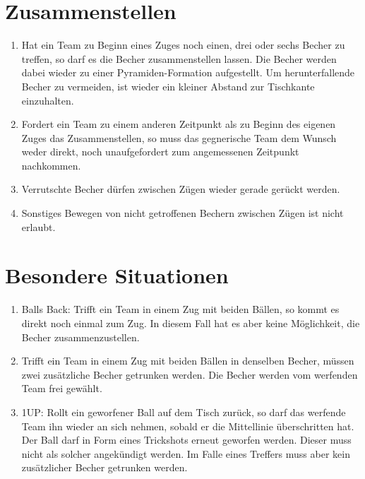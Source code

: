\section{Zusammenstellen}
\begin{enumerate}[label={(\arabic*)}]
    \item
    Hat ein Team zu Beginn eines Zuges noch einen, drei oder sechs Becher zu treffen, so darf es die Becher zusammenstellen lassen.
    Die Becher werden dabei wieder zu einer Pyramiden-Formation aufgestellt.
    Um herunterfallende Becher zu vermeiden, ist wieder ein kleiner Abstand zur Tischkante einzuhalten.

    \item
    Fordert ein Team zu einem anderen Zeitpunkt als zu Beginn des eigenen Zuges das Zusammenstellen, so muss das gegnerische Team dem Wunsch weder direkt, noch unaufgefordert zum angemessenen Zeitpunkt nachkommen.

    \item
    Verrutschte Becher dürfen zwischen Zügen wieder gerade gerückt werden.

    \item
    Sonstiges Bewegen von nicht getroffenen Bechern zwischen Zügen ist nicht erlaubt.
\end{enumerate}

\section{Besondere Situationen}
\begin{enumerate}[label={(\arabic*)}]
    \item
    \glqq{}Balls Back\grqq{}: Trifft ein Team in einem Zug mit beiden Bällen, so kommt es direkt noch einmal zum Zug.
    In diesem Fall hat es aber keine Möglichkeit, die Becher zusammenzustellen.

    \item
    Trifft ein Team in einem Zug mit beiden Bällen in denselben Becher, müssen zwei zusätzliche Becher getrunken werden.
    Die Becher werden vom werfenden Team frei gewählt.

    \item
    \glqq{}1UP\grqq{}: Rollt ein geworfener Ball auf dem Tisch zurück, so darf das werfende Team ihn wieder an sich nehmen, sobald er die Mittellinie überschritten hat.
    Der Ball darf in Form eines Trickshots erneut geworfen werden.
    Dieser muss nicht als solcher angekündigt werden.
    Im Falle eines Treffers muss aber kein zusätzlicher Becher getrunken werden.
\end{enumerate}
